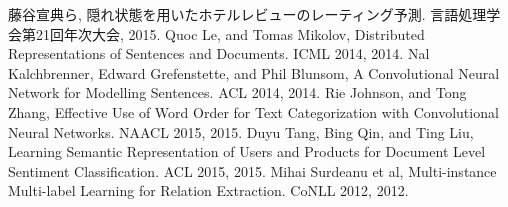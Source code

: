 \documentclass{ttisummary}
\begin{document}
%
%







\begin{thebibliography}{9}
  藤谷宣典ら,
  隠れ状態を用いたホテルレビューのレーティング予測.
  言語処理学会第21回年次大会, 2015.
  Quoc Le, and Tomas Mikolov,
  Distributed Representations of Sentences and Documents.
  ICML 2014, 2014.
  Nal Kalchbrenner, Edward Grefenstette, and Phil Blunsom,
  A Convolutional Neural Network for Modelling Sentences.
  ACL 2014, 2014.
  Rie Johnson, and Tong Zhang,
  Effective Use of Word Order for Text Categorization
  with Convolutional Neural Networks.
  NAACL 2015, 2015.
  Duyu Tang, Bing Qin, and Ting Liu,
  Learning Semantic Representation of Users and Products
  for Document Level Sentiment Classification.
  ACL 2015, 2015.
  Mihai Surdeanu et al,
  Multi-instance Multi-label Learning for Relation Extraction.
  CoNLL 2012, 2012.
\end{thebibliography}
\end{document}
